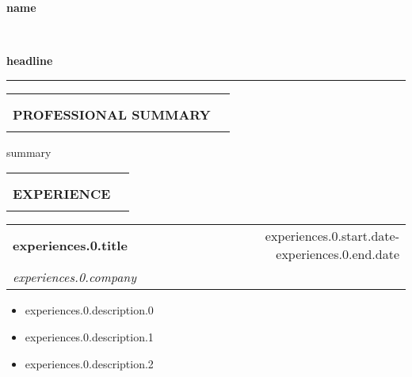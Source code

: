 \documentclass{article}
\makeatletter
\newcommand{\cvsection}[1]{
\setlength{\arrayrulewidth}{2pt}
\begin{tabular}{@{}ll}
& \\
& \\
\textbf{\Large #1} & \\[3pt]
\hline
& \\
\end{tabular}
}
\newcommand*{\ClipSep}{0.4cm}
\makeatother
\begin{document}
\pagestyle{empty}

\begin{paracol}{2}

\begin{minipage}{0.7\linewidth}
{\LARGE \textbf{name}} 

~

{\Large \textbf{headline}}

\end{minipage} \hfill
\begin{minipage}{0.18\linewidth}
\end{minipage}

\rule{1.2\linewidth}{0.4pt}

\cvsection{PROFESSIONAL SUMMARY}

{summary}

\cvsection{EXPERIENCE}

\colorbox{maincolor!10}{%
  \begin{minipage}{\linewidth}
    \begin{tabular}{@{}l r}
        \textbf{{experiences.0.title}} &  
        \footnotesize{{experiences.0.start.date}-{experiences.0.end.date}} \\
        \textit{{experiences.0.company}} & \\
    \end{tabular}
    \begin{itemize}
        \item {experiences.0.description.0}
        \item {experiences.0.description.1}
        \item {experiences.0.description.2}
    \end{itemize}
  \end{minipage}%
}

\vspace{5mm}


\end{paracol}
\end{document}
